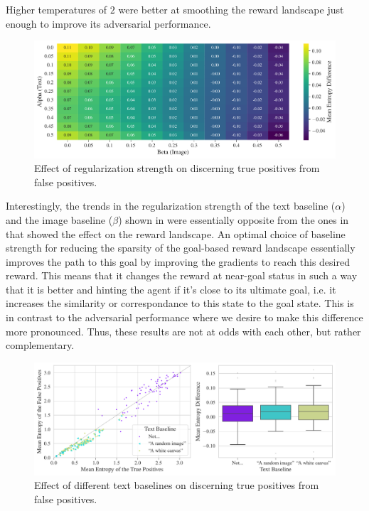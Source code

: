 Higher temperatures of \(2\) were better at smoothing the reward landscape just enough to improve its adversarial performance.

\begin{figure}[h]
    \centering
    \includegraphics[width=\textwidth]{images/alpha_beta_adversarial.pdf}
    \caption{Effect of regularization strength on discerning true positives from false positives.}
    \label{fig:clip-alpha-beta-adversarial}
\end{figure}

Interestingly, the trends in the regularization strength of the text baseline (\(\alpha\)) and the image baseline (\(\beta\)) shown in  were essentially opposite from the ones in  that showed the effect on the reward landscape.
An optimal choice of baseline strength for reducing the sparsity of the goal-based reward landscape essentially improves the path to this goal by improving the gradients to reach this desired reward.
This means that it changes the reward at near-goal status in such a way that it is better and hinting the agent if it's close to its ultimate goal, i.e. it increases the similarity or correspondance to this state to the goal state.
This is in contrast to the adversarial performance where we desire to make this difference more pronounced.
Thus, these results are not at odds with each other, but rather complementary. 

\begin{figure}[h]
    \centering
    \includegraphics[width=\textwidth]{images/baseline_adversarial_2.pdf}
    \caption{Effect of different text baselines on discerning true positives from false positives.}
    \label{fig:baseline-adversarial}
\end{figure}

